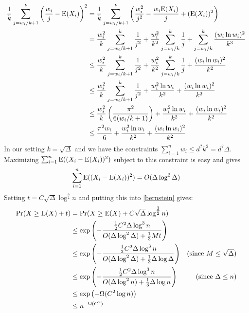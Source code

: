 \documentclass[kpfonts]{patmorin}
\begin{document}
\begin{align*}
\frac{1}{k}\sum_{j=w_i/k+1}^k \left(\frac{w_i}{j}-\mathrm{E}(X_i)\right)^2
 & = \frac{1}{k}\sum_{j=w_i/k+1}^k \left(\frac{w_i^2}{j^2}-\frac{w_i \mathrm{E}(X_i)}{j} + (\mathrm{E}(X_i))^2\right) \\
 & = \frac{w_i^2}{k}\sum_{j=w_i/k+1}^k\frac{1}{j^2}
   + \frac{w_i^2}{k^2}\sum_{j=w_i/k}^k\frac{1}{j} + \sum_{j=w_i/k}^k\frac{(w_i\ln w_i)^2}{k^3} \\
 & \le \frac{w_i^2}{k}\sum_{j=w_i/k+1}^k\frac{1}{j^2}
   + \frac{w_i^2}{k^2}\sum_{j=w_i/k}^k\frac{1}{j} + \frac{(w_i\ln w_i)^2}{k^2}\\
 & \le \frac{w_i^2}{k}\sum_{j=w_i/k+1}^k\frac{1}{j^2}
    + \frac{w_i^2\ln w_i}{k^2} + \frac{(w_i\ln w_i)^2}{k^2} \\
 & \le \frac{w_i^2}{k}\left(\frac{\pi^2}{6(w_i/k+1)}\right)
    + \frac{w_i^2\ln w_i}{k^2} + \frac{(w_i\ln w_i)^2}{k^2} \\
  & \le \frac{\pi^2 w_i}{6}
     + \frac{w_i^2\ln w_i}{k^2} + \frac{(w_i\ln w_i)^2}{k^2} \\
\end{align*}
In our setting $k=\sqrt{\Delta}$ and we have the constraints $\sum_{i=1}^n w_i \le d^?k^2=d^?\Delta$.  Maximizing $\sum_{i=1}^n\mathrm{E}((X_i-\mathrm{E}(X_i))^2)$ subject to this constraint is easy and gives
\[
  \sum_{i=1}^n\mathrm{E}((X_i-\mathrm{E}(X_i))^2) = O(\Delta\log^{2}\Delta)
\]
Setting $t=C\sqrt{\Delta}\log^{\tfrac{3}{2}}n$ and putting this into \cref{bernstein} gives:
\begin{align*}
  \Pr(X\ge \mathrm{E}(X)+t)
  & = \Pr(X\ge \mathrm{E}(X)+C\sqrt{\Delta}\log^{\tfrac{3}{2}}n) \\
  & \le \exp \left(-\frac{\tfrac{1}{2}C^2\Delta\log^3n}{O(\Delta\log^{2}\Delta) + \tfrac{1}{3}Mt}\right) \\
  & \le \exp \left(-\frac{\tfrac{1}{2}C^2\Delta\log^3n}{O(\Delta\log^{2}\Delta) + \tfrac{1}{3}\Delta\log\Delta}\right) & \text{(since $M\le\sqrt{\Delta}$)} \\
  & \le \exp \left(-\frac{\tfrac{1}{2}C^2\Delta\log^3n}{O(\Delta\log^{2}n) + \tfrac{1}{3}\Delta\log n}\right) & \text{(since $\Delta \le n$)} \\
  & \le \exp \left(-\Omega(C^2\log n)\right) \\
  & \le n^{-\Omega(C^2)}
\end{align*}
\end{document}
